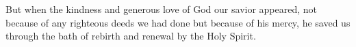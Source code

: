 \lettrine[lines=3]{B}{}ut when the kindness and generous love of God our savior appeared, not because of any righteous deeds we had done but because of his mercy, he saved us through the bath of rebirth and renewal by the Holy Spirit.